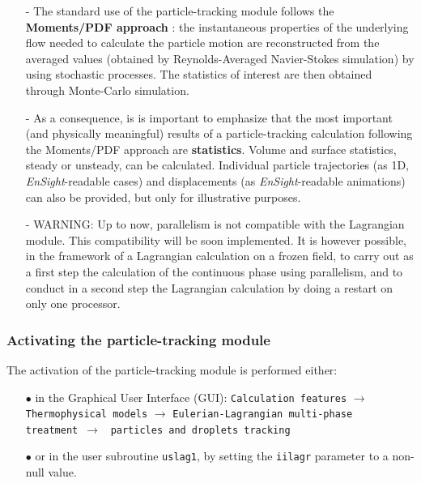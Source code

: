 {{{\begin{itemize}
\item[-] The standard use of the particle-tracking module follows the \textbf{Moments/PDF approach} : the instantaneous properties of the underlying flow needed to calculate the particle motion are reconstructed from the averaged values (obtained by Reynolds-Averaged Navier-Stokes simulation) by using stochastic processes. The statistics of interest are then obtained through Monte-Carlo simulation.

\item[-] As a consequence, is is important to emphasize that the most important (and physically meaningful) results of a particle-tracking calculation following the Moments/PDF approach are \mbox{\textbf{statistics}}. Volume and surface statistics, steady or unsteady, can be calculated. Individual particle trajectories (as 1D, \textit{EnSight}-readable cases) and displacements (as \textit{EnSight}-readable animations) can also be provided, but only for illustrative purposes.   
                                                                                                                                                                                                              
\item[-] WARNING: Up to now, parallelism is not compatible with the Lagrangian module. This compatibility will be soon implemented. It is however possible, in the framework of a Lagrangian calculation on a frozen field, to carry out as a first step the calculation of the continuous phase using parallelism, and to conduct in a second step the Lagrangian calculation by doing a restart on only one processor.

\end{itemize}

\subsubsection{Activating the particle-tracking module}\label{sec:acti-lag}

The activation of the particle-tracking module is performed either:
%
\begin{itemize}
 \item [$\bullet$] in the Graphical User Interface (GUI): \texttt{Calculation features} $\rightarrow$ \texttt{Thermophysical models} $\rightarrow$ \texttt{Eulerian-Lagrangian multi-phase treatment}~$\rightarrow$ ~\texttt{particles and droplets tracking}
 \item [$\bullet$] or in the user subroutine \texttt{uslag1}, by setting the \texttt{iilagr} parameter to a non-null value. 
\end{itemize}

}}}
